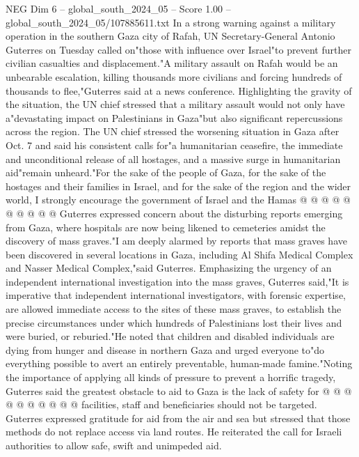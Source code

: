 \begin{textsample}{NEG Dim 6 – global\_south\_2024\_05 – Score 1.00 – global\_south\_2024\_05/107885611.txt}  \label{ex:f6_neg_244}
In a strong warning against a military operation in the southern Gaza city of Rafah, UN Secretary-General Antonio Guterres on Tuesday called on"those with influence over Israel"to prevent further civilian casualties and displacement."A military assault on Rafah would be an unbearable escalation, killing thousands more civilians and forcing hundreds of thousands to flee,"Guterres said at a news conference.
Highlighting the gravity of the situation, the UN chief stressed that a military assault would not only have a"devastating impact on Palestinians in Gaza"but also significant repercussions across the region.
The UN chief stressed the worsening situation in Gaza after Oct. 7 and said his consistent calls for"a humanitarian ceasefire, the immediate and unconditional release of all hostages, and a massive surge in humanitarian aid"remain unheard."For the sake of the people of Gaza, for the sake of the hostages and their families in Israel, and for the sake of the region and the wider world, I strongly encourage the government of Israel and the Hamas @ @ @ @ @ @ @ @ @ @ Guterres expressed concern about the disturbing reports emerging from Gaza, where hospitals are now being likened to cemeteries amidst the discovery of mass graves."I am deeply alarmed by reports that mass graves have been discovered in several locations in Gaza, including Al Shifa Medical Complex and Nasser Medical Complex,"said Guterres.
Emphasizing the urgency of an independent international investigation into the mass graves, Guterres said,"It is imperative that independent international investigators, with forensic expertise, are allowed immediate access to the sites of these mass graves, to establish the precise circumstances under which hundreds of Palestinians lost their lives and were buried, or reburied."He noted that children and disabled individuals are dying from hunger and disease in northern Gaza and urged everyone to"do everything possible to avert an entirely preventable, human-made famine."Noting the importance of applying all kinds of pressure to prevent a horrific tragedy, Guterres said the greatest obstacle to aid to Gaza is the lack of safety for @ @ @ @ @ @ @ @ @ @ facilities, staff and beneficiaries should not be targeted.
Guterres expressed gratitude for aid from the air and sea but stressed that those methods do not replace access via land routes.
He reiterated the call for Israeli authorities to allow safe, swift and unimpeded aid.

\end{textsample}
